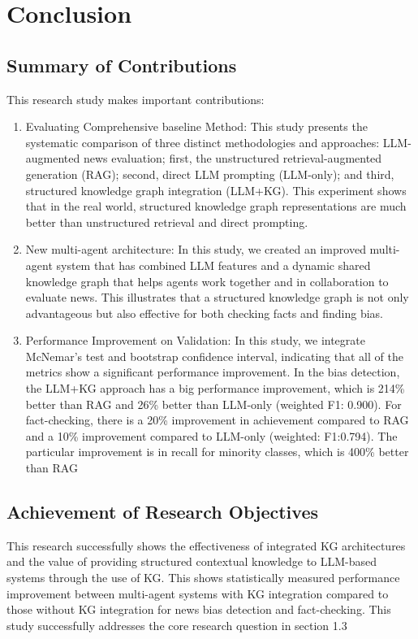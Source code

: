 \documentclass[11pt]{article}
\begin{document}
\section{Conclusion}
\subsection{ Summary of Contributions}
This research study makes important contributions:

\begin{enumerate}
    \item Evaluating Comprehensive baseline Method: This study presents the systematic comparison of three distinct methodologies and approaches: LLM-augmented news evaluation;  first, the unstructured retrieval-augmented generation (RAG); second,  direct LLM prompting (LLM-only); and third, structured knowledge graph integration (LLM+KG). This experiment shows that in the real world, structured knowledge graph representations are much better than unstructured retrieval and direct prompting.

    \item New multi-agent architecture: In this study, we created an improved multi-agent system that has combined LLM features and a dynamic shared knowledge graph that helps agents work together and in collaboration to evaluate news. This illustrates that a structured knowledge graph is not only advantageous but also effective for both checking facts and finding bias.

    \item Performance Improvement on Validation: In this study, we integrate McNemar’s test and bootstrap confidence interval, indicating that all of the metrics show a significant performance improvement. In the bias detection, the LLM+KG approach has a big performance improvement, which is 214\% better than RAG and 26\% better than LLM-only (weighted F1: 0.900). For fact-checking, there is a 20\% improvement in achievement compared to RAG and a 10\% improvement compared to LLM-only (weighted: F1:0.794). The particular improvement is in recall for minority classes, which is 400\% better than RAG

\end{enumerate}


\subsection{Achievement of Research Objectives}
This research successfully shows the effectiveness of integrated KG architectures and the value of providing structured contextual knowledge to LLM-based systems through the use of KG. This shows statistically measured performance improvement between multi-agent systems with KG integration compared to those without  KG integration for news bias detection and fact-checking.
This study successfully addresses the core research question in section 1.3
\end{document}
